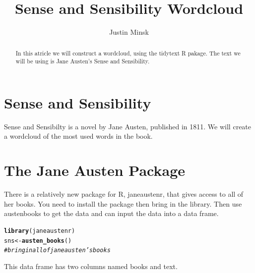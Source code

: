 \documentclass{article}\usepackage[]{graphicx}\usepackage[]{color}
\makeatletter
\newcommand{\hlcom}[1]{\textcolor[rgb]{0.678,0.584,0.686}{\textit{#1}}}%
\newcommand{\hlstd}[1]{\textcolor[rgb]{0.345,0.345,0.345}{#1}}%
\newcommand{\hlkwb}[1]{\textcolor[rgb]{0.69,0.353,0.396}{#1}}%
\newcommand{\hlkwd}[1]{\textcolor[rgb]{0.737,0.353,0.396}{\textbf{#1}}}%
\newenvironment{kframe}{%
 \def\at@end@of@kframe{}%
 \ifinner\ifhmode%
  \def\at@end@of@kframe{\end{minipage}}%
  \begin{minipage}{\columnwidth}%
 \fi\fi%
 \def\FrameCommand##1{\hskip\@totalleftmargin \hskip-\fboxsep
 \colorbox{shadecolor}{##1}\hskip-\fboxsep
     \hskip-\linewidth \hskip-\@totalleftmargin \hskip\columnwidth}%
 \MakeFramed {\advance\hsize-\width
   \@totalleftmargin\z@ \linewidth\hsize
   \@setminipage}}%
 {\par\unskip\endMakeFramed%
 \at@end@of@kframe}
\newenvironment{knitrout}{}{} %
\makeatother
\begin{document}
\title{Sense and Sensibility Wordcloud}
\author{Justin Minsk}
\maketitle

\begin{abstract}

In this atricle we will construct a wordcloud, using the tidytext R pakage. The text we will be using is Jane Austen's Sense and Sensibility.

\end{abstract}

\section{Sense and Sensibility}

Sense and Sensibilty is a novel by Jane Austen, published in 1811. We will create a wordcloud of the most used words in the book.

\section{The Jane Austen Package}

There is a relatively new package for R, janeaustenr, that gives access to all of her books. You need to install the package then bring in the library. Then use austenbooks to get the data and can input the data into a data frame.

\begin{knitrout}
\color{fgcolor}\begin{kframe}
\begin{alltt}
\hlkwd{library}\hlstd{(janeaustenr)}
\hlstd{sns} \hlkwb{<-} \hlkwd{austen_books}\hlstd{()}
\hlcom{#bring in all of jane austen's books}
\end{alltt}
\end{kframe}
\end{knitrout}

This data frame has two columns named books and text.
\end{document}
